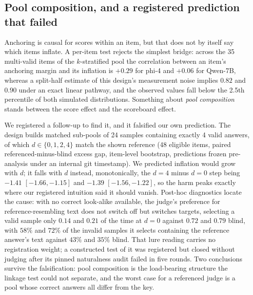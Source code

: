\documentclass[11pt]{article}
\begin{document}
\subsection{Pool composition, and a registered prediction that failed}
\label{sec:dose}

Anchoring is causal for scores within an item, but that does not by itself say which items inflate.
A per-item test rejects the simplest bridge: across the 35 multi-valid items of the $k$-stratified pool the correlation between an item's anchoring margin and its inflation is $+0.29$ for phi-4 and $+0.06$ for Qwen-7B, whereas a split-half estimate of this design's measurement noise implies $0.82$ and $0.90$ under an exact linear pathway, and the observed values fall below the 2.5th percentile of both simulated distributions.
Something about \emph{pool composition} stands between the score effect and the scoreboard effect.

We registered a follow-up to find it, and it falsified our own prediction.
The design builds matched sub-pools of 24 samples containing exactly 4 valid answers, of which $d \in \{0,1,2,4\}$ match the shown reference (48 eligible items, paired referenced-minus-blind excess gap, item-level bootstrap, predictions frozen pre-analysis under an internal git timestamp).
We predicted inflation would grow with $d$; it falls with $d$ instead, monotonically, the $d{=}4$ minus $d{=}0$ step being $-1.41$ $[-1.66, -1.15]$ and $-1.39$ $[-1.56, -1.22]$, so the harm peaks exactly where our registered intuition said it should vanish.
Post-hoc diagnostics locate the cause: with no correct look-alike available, the judge's preference for reference-resembling text does not switch off but switches targets, selecting a valid sample only $0.14$ and $0.21$ of the time at $d{=}0$ against $0.72$ and $0.79$ blind, with $58\%$ and $72\%$ of the invalid samples it selects containing the reference answer's text against $43\%$ and $35\%$ blind.
That lure reading carries no registration weight; a constructed test of it was registered but closed without judging after its pinned naturalness audit failed in five rounds.
Two conclusions survive the falsification: pool composition is the load-bearing structure the linkage test could not separate, and the worst case for a referenced judge is a pool whose correct answers all differ from the key.
\end{document}
